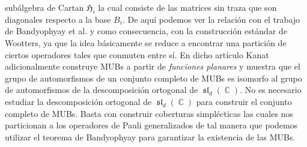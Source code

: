 \documentclass[a4paper,11pt]{report}
\DeclareMathOperator{\C}{\mathbb{C}}
\DeclareMathOperator{\Sl}{\mathfrak{sl}}
\begin{document}
  subálgebra de Cartan $\mathfrak{H}_i$ la cual consiste de
  las matrices sin traza que son diagonales respecto a la
  base $B_i$. De aquí podemos ver la relación con el trabajo
  de Bandyophyay et al. y como consecuencia, con la
  construcción estándar de Wootters, ya que la idea
  básicamente se reduce a encontrar una partición de ciertos
  operadores tales que conmuten entre sí. En dicho artículo
  Kanat adicionalmente construye MUBs a partir de
  \textit{funciones planares} y muestra que el grupo de
  automorfismos de un conjunto completo de MUBs es isomorfo
  al grupo de automorfismos de la descomposición ortogonal
  de $\Sl_d(\C)$. No es necesario estudiar la descomposición
  ortogonal de $\Sl_d(\C)$ para construir el conjunto
  completo de MUBs. Basta con construir coberturas
  simplécticas las cuales nos particionan a los operadores
  de Pauli generalizados de tal manera que podemos utilizar
  el teorema de Bandyophyay para garantizar la existencia de
  las MUBs.
  
\end{document}
